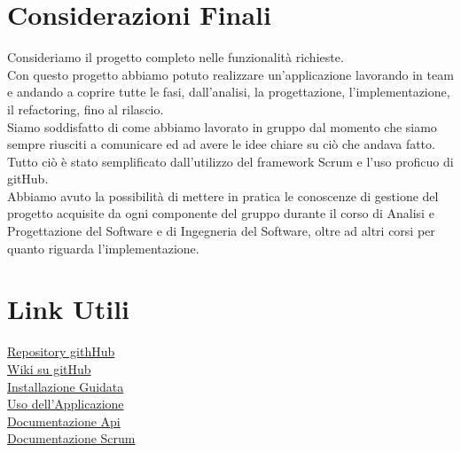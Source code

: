 \documentclass[a4paper,12pt]{report}
\begin{document}
		
		 	
	\section{Considerazioni Finali}
Consideriamo il progetto completo nelle funzionalità richieste.\\
Con questo progetto abbiamo potuto realizzare un'applicazione lavorando in team e andando a coprire tutte le fasi, dall'analisi, la progettazione, l'implementazione, il refactoring, fino al rilascio.\\
Siamo soddisfatto di come abbiamo lavorato in gruppo dal momento che siamo sempre riusciti a comunicare ed ad avere le idee chiare su ciò che andava fatto. Tutto ciò è stato semplificato dall'utilizzo del framework Scrum e l'uso proficuo di gitHub.\\
Abbiamo avuto la possibilità di mettere in pratica le conoscenze di gestione del progetto acquisite da ogni componente del gruppo durante il corso di Analisi e Progettazione del Software e di Ingegneria del Software, oltre ad altri corsi per quanto riguarda l'implementazione.\\
 
	
	
 	\section{Link Utili}  
	\href{https://github.com/lta-unimib/progetto-brew-day-1-brew-day-birra}{Repository githHub}\\
	\href{https://github.com/lta-unimib/progetto-brew-day-1-brew-day-birra/wiki}{Wiki su gitHub}\\
	\href{https://github.com/lta-unimib/progetto-brew-day-1-brew-day-birra/wiki/Installazione-Guidata}{Installazione Guidata}\\
	\href{https://github.com/lta-unimib/progetto-brew-day-1-brew-day-birra/wiki/Uso-dell'Applicazione}{Uso dell'Applicazione}\\
	\href{https://github.com/lta-unimib/progetto-brew-day-1-brew-day-birra/tree/master/backend#readme}{Documentazione Api}\\
	\href{https://github.com/lta-unimib/progetto-brew-day-1-brew-day-birra/tree/master/scrum}{Documentazione Scrum}\\
\end{document}
